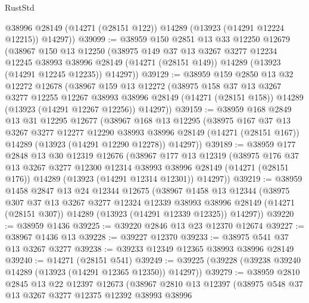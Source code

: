 \begin{lexlean}{RustStd}
\begin{coremodule}
        @38996
        @28149
        (@14271 (@28151 @122))
        @14289
        (@13923 (@14291 @12224 @12215))
        @14297))
@39099 := @38959
    @150
    @2851
    @13
    @33
    @12250
    @12679
    (@38967
      @150
      @13
      @12250
      (@38975
        @149
        @37
        @13
        @3267
        @3277
        @12234
        @12245
        @38993
        @38996
        @28149
        (@14271 (@28151 @149))
        @14289
        (@13923 (@14291 @12245 @12235))
        @14297))
@39129 := @38959
    @159
    @2850
    @13
    @32
    @12272
    @12678
    (@38967
      @159
      @13
      @12272
      (@38975
        @158
        @37
        @13
        @3267
        @3277
        @12255
        @12267
        @38993
        @38996
        @28149
        (@14271 (@28151 @158))
        @14289
        (@13923 (@14291 @12267 @12256))
        @14297))
@39159 := @38959
    @168
    @2849
    @13
    @31
    @12295
    @12677
    (@38967
      @168
      @13
      @12295
      (@38975
        @167
        @37
        @13
        @3267
        @3277
        @12277
        @12290
        @38993
        @38996
        @28149
        (@14271 (@28151 @167))
        @14289
        (@13923 (@14291 @12290 @12278))
        @14297))
@39189 := @38959
    @177
    @2848
    @13
    @30
    @12319
    @12676
    (@38967
      @177
      @13
      @12319
      (@38975
        @176
        @37
        @13
        @3267
        @3277
        @12300
        @12314
        @38993
        @38996
        @28149
        (@14271 (@28151 @176))
        @14289
        (@13923 (@14291 @12314 @12301))
        @14297))
@39219 := @38959
    @1458
    @2847
    @13
    @24
    @12344
    @12675
    (@38967
      @1458
      @13
      @12344
      (@38975
        @307
        @37
        @13
        @3267
        @3277
        @12324
        @12339
        @38993
        @38996
        @28149
        (@14271 (@28151 @307))
        @14289
        (@13923 (@14291 @12339 @12325))
        @14297))
@39220 := @38959 @1436
@39225 := @39220 @2846 @13 @23 @12370 @12674
@39227 := @38967 @1436 @13
@39228 := @39227 @12370
@39233 := @38975 @541 @37 @13 @3267 @3277
@39238 := @39233 @12349 @12365 @38993 @38996 @28149
@39240 := @14271 (@28151 @541)
@39249 := @39225 (@39228 (@39238 @39240 @14289 (@13923 (@14291 @12365 @12350)) @14297))
@39279 := @38959
    @2810
    @2845
    @13
    @22
    @12397
    @12673
    (@38967
      @2810
      @13
      @12397
      (@38975
        @548
        @37
        @13
        @3267
        @3277
        @12375
        @12392
        @38993
        @38996

\end{coremodule}
\end{lexlean}
